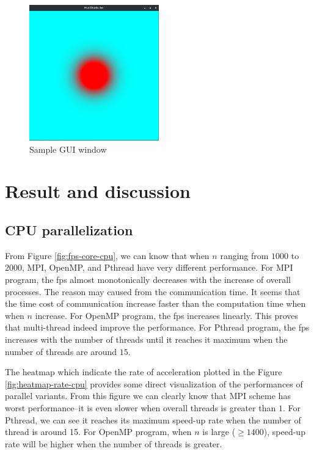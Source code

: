\documentclass[twoside,12pt]{article}
\theoremstyle{definition}
\theoremstyle{remark}
\begin{document}
\begin{figure}[h!]
    \centering
    \includegraphics[width=0.5\textwidth]{../demo.png}
    \caption{Sample GUI window}
    \label{fig:image}
\end{figure}


\newpage
\section{Result and discussion}

\subsection{CPU parallelization}
From Figure \ref{fig:fps-core-cpu}, we can know that
when $n$ ranging from $1000$ to $2000$,
MPI, OpenMP, and Pthread have very different performance.
For MPI program, the fps almost monotonically decreases with the increase of overall
processes.
The reason may caused from the communication time.
It seems that the time cost of communication increase faster than
the computation time when when $n$ increase.
For OpenMP program, the fps increases linearly.
This proves that multi-thread indeed improve the performance.
For Pthread program, the fps increases with the number of threads
until it reaches it maximum when the number of threads are around $15$.

The heatmap which indicate the rate of acceleration plotted in the Figure \ref{fig:heatmap-rate-cpu} 
provides some direct visualization of the performances of parallel variants.
From this figure we can clearly know that MPI scheme has worst performance--it
is even slower when overall threads is greater than $1$.
For Pthread, we can see it reaches its maximum speed-up rate when
the number of thread is around 15.
For OpenMP program, when $n$ is large ($\geq 1400$), speed-up rate will
be higher when the number of threads is greater.
\end{document}

